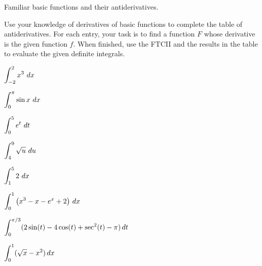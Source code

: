 \begin{margintable}[12cm] %
\caption{Familiar basic functions and their antiderivatives.} \label{T:4.4.Act2}
\end{margintable}

\begin{activity} \label{A:4.5.1}  Use your knowledge of derivatives of basic functions to complete the table of antiderivatives.  For each entry, your task is to find a function $F$ whose derivative is the given function $f$.  When finished, use the FTCII and the results in the table to evaluate the given definite integrals.
\ba
\item $\displaystyle \int_{-2}^2 x^3\ dx$
\item $\displaystyle \int_0^\pi \sin x\ dx$
\item $\displaystyle \int_0^5 e^t\ dt$
\item $\displaystyle \int_4^9 \sqrt{u}\ du$
\item $\displaystyle \int_1^5 2\ dx$
\item  $\displaystyle \int_0^1 \left(x^3 - x - e^x + 2\right) \,dx$
\item  $\displaystyle \int_0^{\pi/3} (2\sin (t) - 4\cos(t) + \sec^2(t) - \pi) \, dt$
\item  $\displaystyle \int_0^1 (\sqrt{x}-x^2) \, dx$
\ea
\end{activity}


